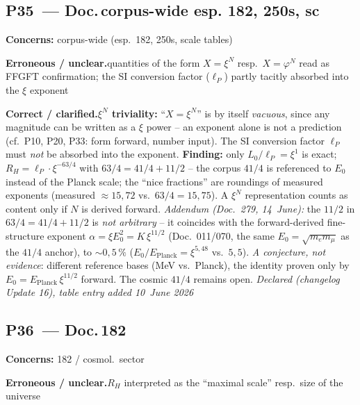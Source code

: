 \medskip


\subsection*{P35~--- Doc.\,corpus-wide esp. 182, 250s, sc}

\noindent\textbf{Concerns:} corpus-wide (esp.\ 182, 250s, scale tables)


\smallskip\noindent\textbf{Erroneous / unclear.}\quad quantities of the form $X = \xi^N$ resp.\ $X = \varphi^N$ read as FFGFT confirmation; the SI conversion factor ($\ell_P$) partly tacitly absorbed into the $\xi$ exponent


\smallskip\noindent\textbf{Correct / clarified.}\quad \textbf{$\xi^N$ triviality:} \enquote{$X = \xi^N$} is by itself \emph{vacuous}, since any magnitude can be written as a $\xi$ power -- an exponent alone is not a prediction (cf.\ P10, P20, P33: form forward, number input). The SI conversion factor $\ell_P$ must \emph{not} be absorbed into the exponent. \textbf{Finding:} only $L_0/\ell_P = \xi^1$ is exact; $R_H = \ell_P\cdot\xi^{-63/4}$ with $63/4 = 41/4 + 11/2$ -- the corpus $41/4$ is referenced to $E_0$ instead of the Planck scale; the \enquote{nice fractions} are roundings of measured exponents (measured $\approx 15{,}72$ vs.\ $63/4 = 15{,}75$). A $\xi^N$ representation counts as content only if $N$ is derived forward. \emph{Addendum (Doc.~279, 14~June):} the $11/2$ in $63/4=41/4+11/2$ is \emph{not arbitrary} -- it coincides with the forward-derived fine-structure exponent $\alpha=\xi E_0^2=K\,\xi^{11/2}$ (Doc.~011/070, the same $E_0=\sqrt{m_em_\mu}$ as the $41/4$ anchor), to $\sim0{,}5\,\%$ ($E_0/E_\text{Planck}=\xi^{5{,}48}$ vs.\ $5{,}5$). \emph{A conjecture, not evidence}: different reference bases (MeV vs.\ Planck), the identity proven only by $E_0=E_\text{Planck}\,\xi^{11/2}$ forward. The cosmic $41/4$ remains open. \emph{Declared (changelog Update 16), table entry added 10~June 2026}


\medskip


\subsection*{P36~--- Doc.\,182}

\noindent\textbf{Concerns:} 182 / cosmol.\ sector


\smallskip\noindent\textbf{Erroneous / unclear.}\quad $R_H$ interpreted as the \enquote{maximal scale} resp.\ size of the universe



